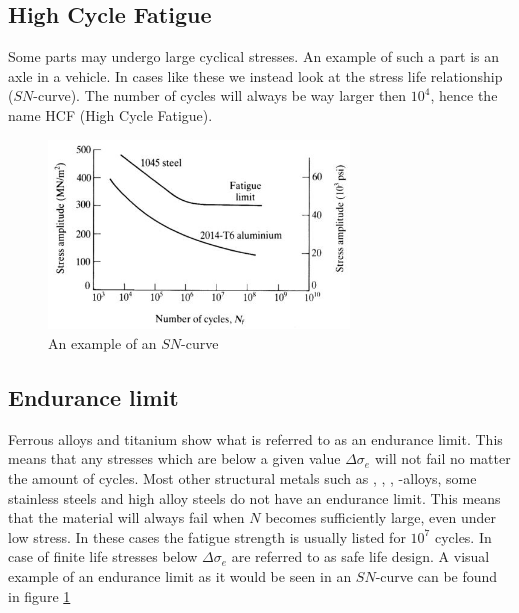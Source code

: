 \documentclass[11pt, a4paper]{article}
\begin{document}
\subsection{High Cycle Fatigue}
Some parts may undergo large cyclical stresses. An example of such a part is an axle in a vehicle. In cases like these we instead look at the stress life relationship ($SN$-curve). The number of cycles will always be way larger then $10^4$, hence the name HCF (High Cycle Fatigue).
\begin{figure}[h]
  \centerline{\includegraphics[width=80mm]{images/SN_curve.jpg}}
  \caption{An example of an $SN$-curve}
  \label{fig:SN}
\end{figure}

\subsection{Endurance limit}
Ferrous alloys and titanium show what is referred to as an endurance limit. This means that any stresses which are below a given value $\Delta \sigma_e$ will not fail no matter the amount of cycles. Most other structural metals such as , , , -alloys, some stainless steels and high alloy steels do not have an endurance limit. This means that the material will always fail when $N$ becomes sufficiently large, even under low stress. In these cases the fatigue strength is usually listed for $10^7$ cycles. In case of finite life stresses below $\Delta \sigma_e$ are referred to as safe life design. A visual example of an endurance limit as it would be seen in an $SN$-curve can be found in figure \ref{fig:SN}
\end{document}
